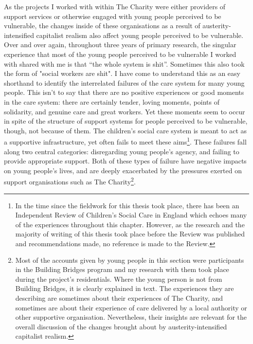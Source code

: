 As the projects I worked with within The Charity were either providers of support services or otherwise engaged with young people perceived to be vulnerable, the changes inside of these organisations as a result of austerity-intensified capitalist realism also affect young people perceived to be vulnerable. Over and over again, throughout three years of primary research, the singular experience that most of the young people perceived to be vulnerable I worked with shared with me is that “the whole system is shit”. Sometimes this also took the form of "social workers are shit". I have come to understand this as an easy shorthand to identify the interrelated failures of the care system for many young people. This isn’t to say that there are no positive experiences or good moments in the care system: there are certainly tender, loving moments, points of solidarity, and genuine care and great workers. Yet these moments seem to occur in spite of the structure of support systems for people perceived to be vulnerable, though, not because of them. The children's social care system is meant to act as a supportive infrastructure, yet often fails to meet these aims\footnote{In the time since the fieldwork for this thesis took place, there has been an Independent Review of Children's Social Care in England \citep{macalister} which echoes many of the experiences throughout this chapter. However, as the research and the majority of writing of this thesis took place before the Review was published and recommendations made, no reference is made to the Review.}. These failures fall along two central categories: disregarding young people's agency, and failing to provide appropriate support. Both of these types of failure have negative impacts on young people's lives, and are deeply exacerbated by the pressures exerted on support organisations such as The Charity\footnote{Most of the accounts given by young people in this section were participants in the Building Bridges program and my research with them took place during the project's residentials. Where the young person is not from Building Bridges, it is clearly explained in text. The experiences they are describing are sometimes about their experiences of The Charity, and sometimes are about their experience of care delivered by a local authority or other supportive organisation. Nevertheless, their insights are relevant for the overall discussion of the changes brought about by austerity-intensified capitalist realism.}.

